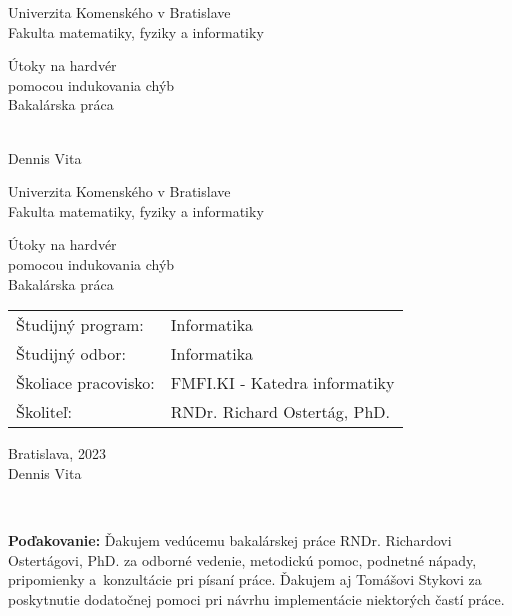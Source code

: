 \documentclass[12pt, twoside]{book}
\def\mfrok{2023}
\def\mfnazov{Útoky na hardvér\\pomocou indukovania chýb}
\def\mftyp{Bakalárska práca}
\def\mfautor{Dennis Vita}
\def\mfskolitel{RNDr. Richard Ostertág, PhD. }
\def\mfmiesto{Bratislava, \mfrok}
\def\mfodbor{ Informatika}
\def\program{ Informatika }
\def\mfpracovisko{ FMFI.KI - Katedra informatiky }
\begin{document}
\frontmatter
\pagestyle{empty}

\begin{center}
\sc\large
Univerzita Komenského v Bratislave\\
Fakulta matematiky, fyziky a informatiky

\vfill

{\LARGE\mfnazov}\\
\mftyp
\end{center}

\vfill

{\sc\large 
\noindent \mfrok\\
\mfautor
}

\cleardoublepage


\noindent
\setcounter{page}{1}

\begin{center}
\sc  
\large
Univerzita Komenského v Bratislave\\
Fakulta matematiky, fyziky a informatiky

\vfill

{\LARGE\mfnazov}\\
\mftyp
\end{center}

\vfill

\noindent
\begin{tabular}{ll}
Študijný program: & \program \\
Študijný odbor: & \mfodbor \\
Školiace pracovisko: & \mfpracovisko \\
Školiteľ: & \mfskolitel \\
\end{tabular}

\vfill


\noindent \mfmiesto\\
\mfautor

\cleardoublepage


\newpage 


\cleardoublepage


\newpage
\pagestyle{plain}
~

\vfill
{\bf Poďakovanie:} Ďakujem vedúcemu bakalárskej práce RNDr. Richardovi Ostertágovi, PhD. za odborné vedenie, metodickú pomoc, podnetné nápady, pripomienky a~konzultácie pri písaní práce. Ďakujem aj Tomášovi Stykovi za poskytnutie dodatočnej pomoci pri návrhu implementácie niektorých častí práce.\\
\end{document}
